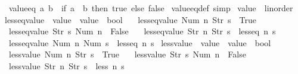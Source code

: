 \begin{isabellebody}
\ \ {\isachardoublequoteopen}value{\isacharunderscore}eq\ a\ b\ {\isasymequiv}\ {\isacharparenleft}if\ a\ {\isacharequal}\ b\ then\ true\ else\ false{\isacharparenright}{\isachardoublequoteclose}\isanewline
{}\isamarkupfalse%
\ value{\isacharunderscore}eq{\isacharunderscore}def\ {\isacharbrackleft}simp{\isacharbrackright}\isanewline
\isanewline
{}\isamarkupfalse%
\ {\isachardoublequoteopen}value{\isachardoublequoteclose}\ {\isacharcolon}{\isacharcolon}\ linorder\ \isanewline
{}\isamarkupfalse%
\ less{\isacharunderscore}eq{\isacharunderscore}value\ {\isacharcolon}{\isacharcolon}\ {\isachardoublequoteopen}value\ {\isasymRightarrow}\ value\ {\isasymRightarrow}\ bool{\isachardoublequoteclose}\ \isanewline
\ \ {\isachardoublequoteopen}less{\isacharunderscore}eq{\isacharunderscore}value\ {\isacharparenleft}Num\ n{\isacharparenright}\ {\isacharparenleft}Str\ s{\isacharparenright}\ {\isacharequal}\ True{\isachardoublequoteclose}\ {\isacharbar}\isanewline
\ \ {\isachardoublequoteopen}less{\isacharunderscore}eq{\isacharunderscore}value\ {\isacharparenleft}Str\ s{\isacharparenright}\ {\isacharparenleft}Num\ n{\isacharparenright}\ {\isacharequal}\ False{\isachardoublequoteclose}\ {\isacharbar}\isanewline
\ \ {\isachardoublequoteopen}less{\isacharunderscore}eq{\isacharunderscore}value\ {\isacharparenleft}Str\ n{\isacharparenright}\ {\isacharparenleft}Str\ s{\isacharparenright}\ {\isacharequal}\ less{\isacharunderscore}eq\ n\ s{\isachardoublequoteclose}\ {\isacharbar}\isanewline
\ \ {\isachardoublequoteopen}less{\isacharunderscore}eq{\isacharunderscore}value\ {\isacharparenleft}Num\ n{\isacharparenright}\ {\isacharparenleft}Num\ s{\isacharparenright}\ {\isacharequal}\ less{\isacharunderscore}eq\ n\ s{\isachardoublequoteclose}\isanewline
\isanewline
{}\isamarkupfalse%
\ less{\isacharunderscore}value\ {\isacharcolon}{\isacharcolon}\ {\isachardoublequoteopen}value\ {\isasymRightarrow}\ value\ {\isasymRightarrow}\ bool{\isachardoublequoteclose}\ \isanewline
\ \ {\isachardoublequoteopen}less{\isacharunderscore}value\ {\isacharparenleft}Num\ n{\isacharparenright}\ {\isacharparenleft}Str\ s{\isacharparenright}\ {\isacharequal}\ True{\isachardoublequoteclose}\ {\isacharbar}\isanewline
\ \ {\isachardoublequoteopen}less{\isacharunderscore}value\ {\isacharparenleft}Str\ s{\isacharparenright}\ {\isacharparenleft}Num\ n{\isacharparenright}\ {\isacharequal}\ False{\isachardoublequoteclose}\ {\isacharbar}\isanewline
\ \ {\isachardoublequoteopen}less{\isacharunderscore}value\ {\isacharparenleft}Str\ n{\isacharparenright}\ {\isacharparenleft}Str\ s{\isacharparenright}\ {\isacharequal}\ less\ n\ s{\isachardoublequoteclose}\ {\isacharbar}\isanewline

\end{isabellebody}
